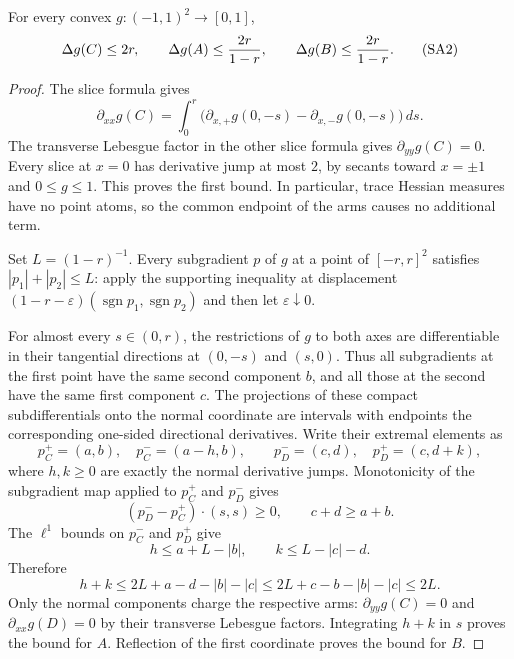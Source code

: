 \begin{lemma}
For every convex $g:(-1,1)^2\to[0,1]$,
\[
 \Delta g(C)\le2r,\qquad
 \Delta g(A)\le {2r\over1-r},\qquad
 \Delta g(B)\le {2r\over1-r}.
 \tag{SA2}
\]
\end{lemma}
\begin{proof}
The slice formula gives
\[
 \partial_{xx}g(C)=\int_0^r
 \bigl(\partial_{x,+}g(0,-s)-\partial_{x,-}g(0,-s)\bigr)\,ds.
\]
The transverse Lebesgue factor in the other slice formula gives
$\partial_{yy}g(C)=0$. Every slice at $x=0$ has derivative jump at most $2$, by secants toward $x=\pm1$ and $0\le g\le1$. This proves the first bound. In particular, trace Hessian measures have no point atoms, so the common endpoint of the arms causes no additional term.

Set $L=(1-r)^{-1}$. Every subgradient $p$ of $g$ at a point of $[-r,r]^2$ satisfies $|p_1|+|p_2|\le L$: apply the supporting inequality at displacement $(1-r-\varepsilon)(\operatorname{sgn}p_1,\operatorname{sgn}p_2)$ and then let $\varepsilon\downarrow0$.

For almost every $s\in(0,r)$, the restrictions of $g$ to both axes are differentiable in their tangential directions at $(0,-s)$ and $(s,0)$. Thus all subgradients at the first point have the same second component $b$, and all those at the second have the same first component $c$. The projections of these compact subdifferentials onto the normal coordinate are intervals with endpoints the corresponding one-sided directional derivatives. Write their extremal elements as
\[
 p_C^+=(a,b),\quad p_C^-=(a-h,b),\qquad
 p_D^-=(c,d),\quad p_D^+=(c,d+k),
\]
where $h,k\ge0$ are exactly the normal derivative jumps.
Monotonicity of the subgradient map applied to $p_C^+$ and $p_D^-$ gives
\[
 (p_D^--p_C^+)\cdot(s,s)\ge0,
 \qquad c+d\ge a+b.
\]
The $\ell^1$ bounds on $p_C^-$ and $p_D^+$ give
\[
 h\le a+L-|b|,\qquad k\le L-|c|-d.
\]
Therefore
\[
 h+k\le2L+a-d-|b|-|c|
       \le2L+c-b-|b|-|c|\le2L.
\]
Only the normal components charge the respective arms: $\partial_{yy}g(C)=0$ and $\partial_{xx}g(D)=0$ by their transverse Lebesgue factors. Integrating $h+k$ in $s$ proves the bound for $A$. Reflection of the first coordinate proves the bound for $B$.
\end{proof}

